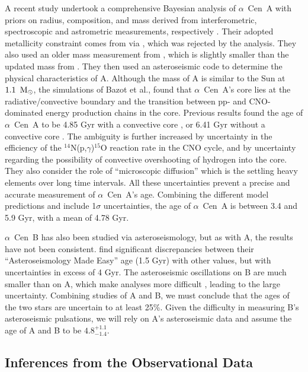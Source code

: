 \documentclass[preprint,12pt]{aastex}
\def\msun{{\rm\,M_\odot}}
\def\eg{{\it e.g.\ }}
\def\acen{{$\alpha$~Cen}}
\begin{document}
A recent study undertook a comprehensive Bayesian analysis of \acen~A
with priors on radius, composition, and mass derived from
interferometric, spectroscopic and astrometric measurements,
respectively \citep{Bazot16}. Their adopted metallicity constraint
comes from \citep{NeuforgeMagain97} via \citep{Thoul03}, which was
rejected by the \citep{HinkelKane13} analysis. They also used an older
mass measurement from \citep{Pourbaix02}, which is slightly smaller
than the updated mass from \citep{PourbaixBoffin16}. They then used an
asteroseismic code to determine the physical characteristics of
A. Although the mass of A is similar to the Sun at $1.1~\msun$, the
simulations of Bazot et al., found that \acen~A's core lies at the
radiative/convective boundary and the transition between pp- and
CNO-dominated energy production chains in the core. Previous results
found the age of \acen~A to be 4.85 Gyr with a convective core
\citep{Thevenin02}, or 6.41 Gyr without a convective core
\citep{Thoul03}. The ambiguity is further increased by uncertainty in
the efficiency of the $^{14}$N(p,$\gamma$)$^{15}$O reaction rate in
the CNO cycle, and by uncertainty regarding the possibility of
convective overshooting of hydrogen into the core. They also consider
the role of ``microscopic diffusion'' which is the settling heavy
elements over long time intervals. All these uncertainties
prevent a precise and accurate measurement of \acen~A's
age. Combining the different model predictions and include 1$\sigma$
uncertainties, the age of \acen~A is between 3.4 and 5.9 Gyr,
with a mean of 4.78 Gyr.

\acen~B has also been studied via asteroseismology, but as with A, the
results have not been consistent. \cite{Lundkvist14} find significant
discrepancies between their ``Asteroseismology Made Easy'' age (1.5
Gyr) with other values, but with uncertainties in excess of 4 Gyr. The
asteroseismic oscillations on B are much smaller than on A, which make
analyses more difficult \citep[see, \eg][]{CarrierBourban03},
leading to the large uncertainty. Combining studies of A and B, we
must conclude that the ages of the two stars are uncertain to at least
25\%. Given the difficulty in measuring B's asteroseismic pulsations,
we will rely on A's asteroseismic data and assume the age of A and B
to be $4.8^{+1.1}_{-1.4}$.

\subsection{Inferences from the Observational Data}
\end{document}
